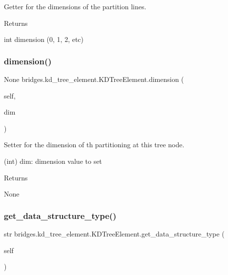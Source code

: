 Getter for the dimensions of the partition lines. 

\begin{DoxyReturn}{Returns}


int dimension (0, 1, 2, etc) 
\end{DoxyReturn}
\mbox{\label{classbridges_1_1kd__tree__element_1_1_k_d_tree_element_a23ec48bd5d7949a2b1e62794344c87f9}} 
\subsubsection{\texorpdfstring{dimension()}{dimension()}\hspace{0.1cm}{\footnotesize\ttfamily [2/2]}}
{\footnotesize\ttfamily  None bridges.\+kd\+\_\+tree\+\_\+element.\+K\+D\+Tree\+Element.\+dimension (\begin{DoxyParamCaption}\item[{}]{self,  }\item[{int}]{dim }\end{DoxyParamCaption})}



Setter for the dimension of th partitioning at this tree node. 

\begin{DoxyVerb}       (int) dim: dimension value to set
\end{DoxyVerb}
 \begin{DoxyReturn}{Returns}


None 
\end{DoxyReturn}
\mbox{\label{classbridges_1_1kd__tree__element_1_1_k_d_tree_element_a4b38af960542ccc8c3b74d90ee9570e2}} 
\subsubsection{\texorpdfstring{get\_data\_structure\_type()}{get\_data\_structure\_type()}}
{\footnotesize\ttfamily  str bridges.\+kd\+\_\+tree\+\_\+element.\+K\+D\+Tree\+Element.\+get\+\_\+data\+\_\+structure\+\_\+type (\begin{DoxyParamCaption}\item[{}]{self }\end{DoxyParamCaption})}



